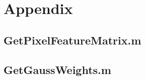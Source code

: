\newpage
\section{Appendix}\label{Appendix}
\subsection{GetPixelFeatureMatrix.m}\label{GetPixelFeatureMatrix}

\subsection{GetGaussWeights.m}\label{GetGaussWeights}

